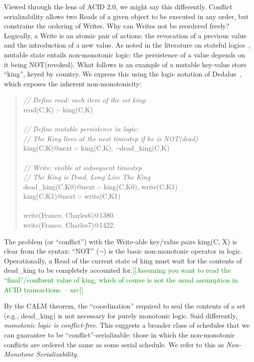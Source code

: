 \documentclass{sig-alternate}
\newcommand{\nrc}[1]{{\textcolor{green}{[[#1 -- nrc]]}}}
\begin{document}
Viewed through the lens of ACID 2.0, we might say this differently.  Conflict
serializability allows two Reads of a given object to be executed in any order,
but constrains the ordering of Writes. Why can Writes not be reordered freely?
Logically, a Write is an atomic pair of actions: the revocation of a previous
value and the introduction of a new value.  As noted in the literature on
stateful logics~\cite{dedalus,statelog}, mutable state entails non-monotonic
logic: the persistence of a value depends on it being NOT(revoked).  What
follows is an example of a mutable key-value store ``king'', keyed by country.
We express this using the logic notation of Dedalus~\cite{dedalus}, which
exposes the inherent non-monotonicity:
\begin{quote}
	\emph{// Define read: each item of the set king: }\\
	read(C,K) :- king(C,K)\\
	\\
	\emph{// Define mutable persistence in logic:}\\
	\emph{// The King lives at the next timestep if he is NOT(dead)}\\
	king(C,K)@next :- king(C,K), $\neg$dead\_king(C,K)\\
	\\
	\emph{// Write: visible at subsequent timestep}\\
	\emph{// The King is Dead, Long Live The King}\\
	dead\_king(C,K0)@next :- king(C,K0), write(C,K1)\\
	king(C,K1)@next :- write(C,K1)\\
	\\
	write(France, Charles6)@1380.\\
	write(France, Charles7)@1422.
\end{quote}
The problem (or ``conflict'') with the Write-able key/value pairs king(C, X) is
clear from the syntax: ``NOT'' ($\neg$) is the basic non-monotonic operator in
logic.  Operationally, a Read of the current state of king must wait for the
contents of dead\_king to be completely accounted for.\nrc{Assuming you want to
  read the ``final''/confluent value of king, which of course is not the usual
  assumption in ACID transactions.}

By the CALM theorem, the ``coordination'' required to seal the contents of a set
(e.g., dead\_king) is not necessary for purely monotonic logic.  Said
differently, \emph{monotonic logic is conflict-free}.  This suggests a broader
class of schedules that we can guarantee to be ``conflict''-serializable: those
in which the non-monotonic conflicts are ordered the same as some serial
schedule.  We refer to this as \emph{Non-Monotone Serializability}.
\end{document}

